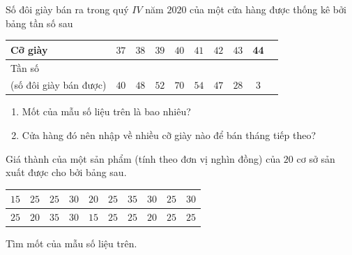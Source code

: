 \begin{bt}%
	Số đôi giày bán ra trong quý $IV$ năm $2020$ của một cửa hàng được thống kê bởi bảng tần số sau
	\begin{center}
		\begin{tabular}{|p{2.2cm}|c|c|c|c|c|c|c|c|c|}
			\hline 
			\centering
			Cỡ giày	&$37$	&$38$	&$39$	&$40$ &$41$ &$42$ & $43$&44\\
			\hline 
			\centering
			Tần số \\(số đôi giày bán được)	&$40$	&$48$	&$52$	&$70$ &$54$ &$47$ &$28$&3 \\
			\hline 
		\end{tabular}
	\end{center}
	\begin{enumerate}
		\item Mốt của mẫu số liệu trên là bao nhiêu?
		\item Cửa hàng đó nên nhập về nhiều cỡ giày nào để bán tháng tiếp theo?
	\end{enumerate}
\end{bt}

\begin{bt}%
	Giá thành của một sản phẩm (tính theo đơn vị nghìn đồng) của $20$ cơ sở sản xuất được cho bởi bảng sau.
	\begin{center}
		\begin{tabular}{|c|c|c|c|c|c|c|c|c|c|}
			\hline
			$15$ & $25$ & $25$ & $30$ & $20$ & $25$ & $35$ & $30$ & $25$ & $30$\\
			\hline
			$25$ & $20$ & $35$ & $30$ & $15$ & $25$ & $25$ & $20$ & $25$ & $25$\\
			\hline
		\end{tabular}
	\end{center}
	Tìm mốt của mẫu số liệu trên.
\end{bt}

